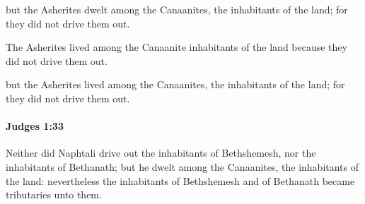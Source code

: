			\begin{versebox}
					\item[BHS] 
					\item[ASV] but the Asherites dwelt among the Canaanites, the inhabitants of the land; for they did not drive them out.
					\item[NIV] The Asherites lived among the Canaanite inhabitants of the land because they did not drive them out.
					\item[NRSV] but the Asherites lived among the Canaanites, the inhabitants of the land; for they did not drive them out.
			\end{versebox}

		\paragraph{Judges 1:33} %
			\label{JUDGES-1-33}

			Neither did Naphtali drive out the inhabitants of Bethshemesh, nor the inhabitants of Bethanath; but he dwelt among the Canaanites, the inhabitants of the land: nevertheless the inhabitants of Bethshemesh and of Bethanath became tributaries unto them.

